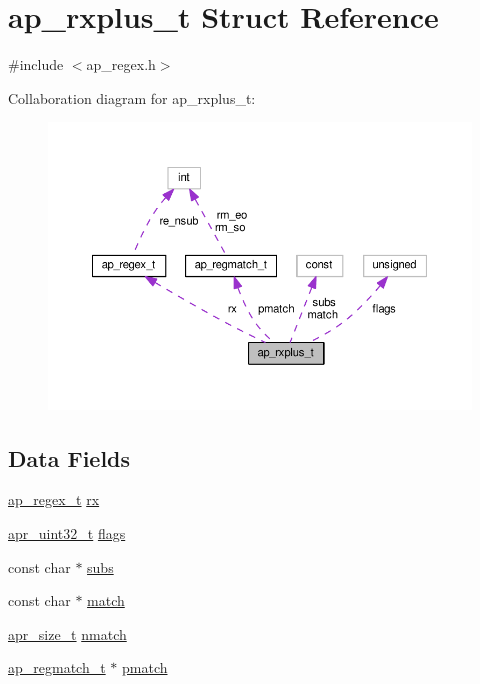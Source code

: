\hypertarget{structap__rxplus__t}{}\section{ap\+\_\+rxplus\+\_\+t Struct Reference}
\label{structap__rxplus__t}


{\ttfamily \#include $<$ap\+\_\+regex.\+h$>$}



Collaboration diagram for ap\+\_\+rxplus\+\_\+t\+:
\nopagebreak
\begin{figure}[H]
\begin{center}
\leavevmode
\includegraphics[width=350pt]{structap__rxplus__t__coll__graph}
\end{center}
\end{figure}
\subsection*{Data Fields}
\begin{DoxyCompactItemize}
\item 
\hyperlink{structap__regex__t}{ap\+\_\+regex\+\_\+t} \hyperlink{structap__rxplus__t_a33c4c58e5669f37c8df083c30402ab8a}{rx}
\item 
\hyperlink{group__apr__platform_ga558548a135d8a816c4787250744ea147}{apr\+\_\+uint32\+\_\+t} \hyperlink{structap__rxplus__t_aa9cfb5c5e30c566d51e14c5fa36cfc3d}{flags}
\item 
const char $\ast$ \hyperlink{structap__rxplus__t_a41a7e2f61d38dc5ef5c58dcffc31e23e}{subs}
\item 
const char $\ast$ \hyperlink{structap__rxplus__t_a6cfdef7623d17fbab28e723e77b115c1}{match}
\item 
\hyperlink{group__apr__platform_gaaa72b2253f6f3032cefea5712a27540e}{apr\+\_\+size\+\_\+t} \hyperlink{structap__rxplus__t_ac3aefa5f1584981f3c795313f2b3f58c}{nmatch}
\item 
\hyperlink{structap__regmatch__t}{ap\+\_\+regmatch\+\_\+t} $\ast$ \hyperlink{structap__rxplus__t_ab5940f990c32da862a530927809adf43}{pmatch}
\end{DoxyCompactItemize}


